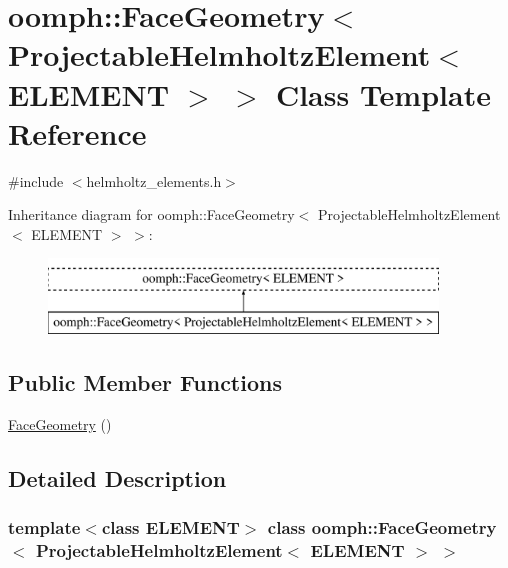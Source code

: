 \hypertarget{classoomph_1_1FaceGeometry_3_01ProjectableHelmholtzElement_3_01ELEMENT_01_4_01_4}{}\section{oomph\+:\+:Face\+Geometry$<$ Projectable\+Helmholtz\+Element$<$ E\+L\+E\+M\+E\+NT $>$ $>$ Class Template Reference}
\label{classoomph_1_1FaceGeometry_3_01ProjectableHelmholtzElement_3_01ELEMENT_01_4_01_4}


{\ttfamily \#include $<$helmholtz\+\_\+elements.\+h$>$}

Inheritance diagram for oomph\+:\+:Face\+Geometry$<$ Projectable\+Helmholtz\+Element$<$ E\+L\+E\+M\+E\+NT $>$ $>$\+:\begin{figure}[H]
\begin{center}
\leavevmode
\includegraphics[height=2.000000cm]{classoomph_1_1FaceGeometry_3_01ProjectableHelmholtzElement_3_01ELEMENT_01_4_01_4}
\end{center}
\end{figure}
\subsection*{Public Member Functions}
\begin{DoxyCompactItemize}
\item 
\hyperlink{classoomph_1_1FaceGeometry_3_01ProjectableHelmholtzElement_3_01ELEMENT_01_4_01_4_a7b2e24560e06a6f1019d73380fd32639}{Face\+Geometry} ()
\end{DoxyCompactItemize}


\subsection{Detailed Description}
\subsubsection*{template$<$class E\+L\+E\+M\+E\+NT$>$\newline
class oomph\+::\+Face\+Geometry$<$ Projectable\+Helmholtz\+Element$<$ E\+L\+E\+M\+E\+N\+T $>$ $>$}

